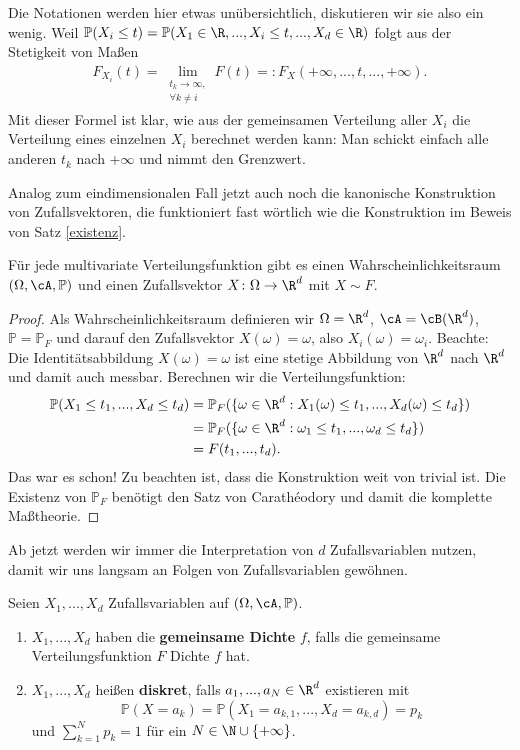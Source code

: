 Die Notationen werden hier etwas un\"ubersichtlich, diskutieren wir sie also ein wenig. Weil $\mathbb P(X_i\leq t)=\mathbb P(X_1\in \R, ..., X_i\leq t, ..., X_d\in \R)$ folgt aus der Stetigkeit von Ma\ss en
\begin{align*}
	F_{X_i}(t) =\lim\limits_{\substack{t_k \to \infty,\\ \forall k\neq i}} F(t)=: F_X(+\infty,..., t, ...,+\infty).
\end{align*}
Mit dieser Formel ist klar, wie aus der gemeinsamen Verteilung aller $X_i$ die Verteilung eines einzelnen $X_i$ berechnet werden kann: Man schickt einfach alle anderen $t_k$ nach $+\infty$ und nimmt den Grenzwert. \smallskip

Analog zum eindimensionalen Fall jetzt auch noch die kanonische Konstruktion von Zufallsvektoren, die funktioniert fast w\"ortlich wie die Konstruktion im Beweis von Satz \ref{existenz}.
\begin{satz}\label{kan}
	Für jede multivariate Verteilungsfunktion gibt es einen Wahrscheinlichkeitsraum $(\Omega, \cA, \mathbb{P})$ und einen Zufallsvektor $X \colon \Omega \to \R^d$ mit $X \sim F$.
\end{satz}
\begin{proof}
	Als Wahrscheinlichkeitsraum definieren wir $\Omega=\R^d$, $\cA = \cB(\R^d)$, $\mathbb{P} = \mathbb{P}_F$ und darauf den Zufallsvektor $X(\omega) = \omega$, also $X_i(\omega)=\omega_i$. Beachte: Die Identit\"atsabbildung $X(\omega)=\omega$ ist eine stetige Abbildung von $\R^d$ nach $\R^d$ und damit auch messbar. Berechnen wir die Verteilungsfunktion:
	\begin{align*} 
		\mathbb{P}(X_1\leq t_1, ..., X_d\leq t_d) 
		&=	\mathbb{P}_F(\{\omega \in \R^d: X_1(\omega) \leq t_1, ..., X_d(\omega)\leq t_d\})\\
		&=\mathbb{P}_F(\{\omega \in \R^d: \omega_1\leq t_1, ..., \omega_d\leq t_d\})\\
		&=F(t_1,...,t_d).
 \end{align*} 
	Das war es schon! Zu beachten ist, dass die Konstruktion weit von trivial ist. Die Existenz von $\mathbb P_F$ ben\"otigt den Satz von Carath\'eodory und damit die komplette Ma\ss theorie. 
\end{proof}
Ab jetzt werden wir immer die Interpretation von $d$ Zufallsvariablen nutzen, damit wir uns langsam an Folgen von Zufallsvariablen gew\"ohnen. 
\begin{deff}
	Seien $X_1,...,X_d$ Zufallsvariablen auf $(\Omega, \cA, \mathbb{P})$.
	\begin{enumerate}[label=(\roman*)]
		\item $X_1,...,X_d$ haben die \textbf{gemeinsame Dichte} $f$, falls die gemeinsame Verteilungsfunktion $F$ Dichte $f$ hat.
		\item $X_1,...,X_d$ heißen \textbf{diskret}, falls $a_1,...,a_N \in \R^d$ existieren mit $$\mathbb{P}(X=a_k) = \mathbb{P}(X_1=a_{k,1},..., X_d = a_{k,d}) = p_k$$ und $ \sum_{k=1}^{N} p_k = 1$ f\"ur ein $N \in \N \cup \{ +\infty \}  $.
	\end{enumerate}
\end{deff}
